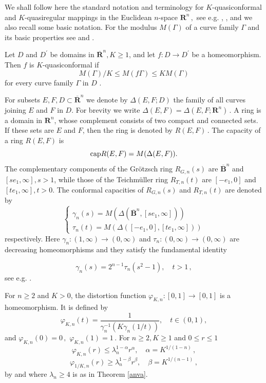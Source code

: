 \documentclass[12pt,a4paper,leqno]{amsart}
\theoremstyle{plain}
\numberwithin{equation}{section}          %
\begin{document}
We shall follow here the standard notation and terminology for
$K$-quasiconformal and $K$-quasiregular mappings in the Euclidean $n$-space $
\mathbf{R}^n\,,$ see e.g. \cite{v}, \cite{vuobook}, and we also recall some
basic notation. For the modulus $M( \Gamma)$ of a curve family
$\Gamma$ and its basic properties see \cite{v} and \cite{vuobook}.


Let $D$ and $D^{'}$ be domains in $\overline{\mathbf{R}}^n,K\geq 1$, and let
$f:D\to D^{'}$ be a homeomorphism. Then $f$ is $K$-quasiconformal if
$$M(\Gamma)/K\leq M(f\Gamma)\leq K M(\Gamma)$$
for every curve family $\Gamma$ in $D$ \cite{v}.\




For subsets $E,F, D\subset \overline{\mathbf{R}}^n$ we denote by
$\Delta(E,F;D)$ the family of all curves joining $E$ and $F$ in $D$.
For brevity we write $\Delta(E,F)= \Delta(E,F;{\mathbf{R}}^n)\,.$
A ring is a domain in ${\mathbf{R}}^n$, whose complement consists of
two compact and connected sets. If these sets are $E$ and $F$, then the
ring is denoted by $R(E,F)\,.$ The capacity of a ring $R(E,F)$ is
$${\rm cap}R(E,F)=M(\Delta(E,F)).$$
The complementary components of the Gr\"otzsch ring $R_{G,n}(s)$ are $\overline{\mathbf{B}}^n$
and $[se_1,\infty], s>1$, while those of the Teichm\"uller ring $R_{T,n}(t)$ are $[-e_1,0]$
and $[te_1,\infty],t>0$. The  conformal capacities of $R_{G,n}(s)$ and $R_{T,n}(t)$ are denoted by
$$\left\{\begin{array}{lll}\gamma_n(s)=M(\Delta(\overline{\mathbf{B}}^n,[se_1,\infty]))\\

\tau_n(t)=M(\Delta([-e_1,0],[te_1,\infty]))\end{array}\right.$$
respectively. Here $\gamma_n:(1,\infty)\to(0,\infty)$ and $\tau_n:(0,\infty)\to(0,\infty)$
are decreasing homeomorphisms and they satisfy the fundamental identity

\begin{equation}\label{1}
\gamma_n(s)=2^{n-1}\tau_n(s^2-1),\quad t>1\,,
\end{equation}
see e.g. \cite[5.53]{vuobook}.

For $n\geq 2$ and $K > 0$, the distortion function $\varphi_{K,n}:
[0,1]\to [0,1]$ is a
homeomorphism. It is defined by
\begin{equation}\label{2}
\varphi_{K,n}(t)=\displaystyle\frac{1}{\gamma_n^{-1}(K\gamma_n(1/t))},\quad t\in(0,1),
\end{equation}
and $\varphi_{K,n}(0)=0\,,$  $\varphi_{K,n}(1)=1\,.$  For $n\geq 2, K\geq 1$ and $0\leq r\leq 1$
\begin{equation}\label{3}
\varphi_{K,n}(r)\leq \lambda_n^{1-\alpha}r^\alpha, \quad \alpha=K^{1/(1-n)}\,,
\end{equation}
\begin{equation}\label{3a}
\varphi_{1/K,n}(r)\geq \lambda_n^{1-\beta}r^\beta,
\quad \beta=K^{1/(n-1)} \,,
\end{equation}
by \cite[Theorem 7.47]{vuobook} and where $\lambda_n\ge 4$ is as in
Theorem \ref{anva}.
\end{document}
